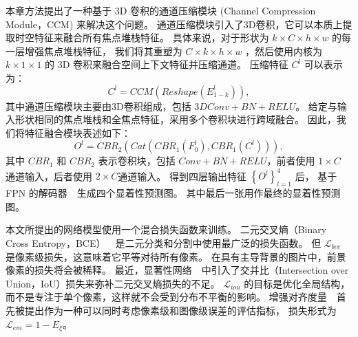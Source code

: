 本章方法提出了一种基于 3D 卷积的通道压缩模块 (Channel Compression Module，CCM) 来解决这个问题。 
通道压缩模块引入了3D卷积，它可以本质上提取时空特征来融合所有焦点堆栈特征。
具体来说，对于形状为 $ k \times C \times h \times w $ 的每一层增强焦点堆栈特征，
我们将其重塑为 $ C \times  k \times  h \times w $ ，然后使用内核为 $ k \times 1 \times 1 $  的 3D 卷积来融合空间上下文特征并压缩通道。 压缩特征 $ C^{l} $ 可以表示为：
%
%
\begin{equation}
	C^{l} = CCM \left ( Reshape \left ( E_{1-k}^{l} \right ) \right ) ,
\end{equation}
%
%
其中通道压缩模块主要由3D卷积组成，包括 $3DConv+BN+RELU$。 给定与输入形状相同的焦点堆栈和全焦点特征，采用多个卷积块进行跨域融合。 因此，我们将特征融合模块表述如下：
%
%
%	
\begin{equation}
	O^{l}=CBR_{2}\left (Cat \left (CBR_{1} \left (F_{0}^{l} \right ),CBR_{1} \left (C^{l} \right ) \right ) \right ),
\end{equation}
%
%
其中 $CBR_{1}$ 和 $CBR_{2}$ 表示卷积块，包括 $Conv+BN+RELU$，前者使用 $1 \times C$ 通道输入，后者使用 $2 \times C$通道输入。
得到四层输出特征 $\left \{ O^{l} \right \}_{l=1}^{4} $ 后， 基于 FPN 的解码器~\cite{lin2017feature}~生成四个显着性预测图。 
其中最后一张用作最终的显着性预测图。 
%
%
%
%
%










本文所提出的网络模型使用一个混合损失函数来训练。
二元交叉熵（Binary Cross Entropy，BCE）~\cite{de2005tutorial}~是二元分类和分割中使用最广泛的损失函数。 但 $\mathcal L_{bce} $ 是像素级损失，这意味着它平等对待所有像素。
在具有主导背景的图片中，前景像素的损失将会被稀释。 最近，显著性网络~\cite{qin2019basnet}~中引入了交并比（Intersection over Union，IoU）损失来弥补二元交叉熵损失的不足。
$ \mathcal L_{iou} $ 的目标是优化全局结构，而不是专注于单个像素，这样就不会受到分布不平衡的影响。 增强对齐度量~\cite{fan2018enhanced}~首先被提出作为一种可以同时考虑像素级和图像级误差的评估指标，
损失形式为 $ \mathcal L_{em} = 1 - E_{\xi} $。 

